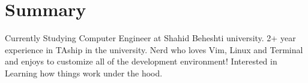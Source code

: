 \section{Summary}\closesection{}
Currently Studying Computer Engineer at Shahid Beheshti university.
2+ year experience in TAship in the university. 
Nerd who loves Vim, Linux and Terminal and enjoys to customize all of the development environment!
Interested in Learning how things work under the hood.
